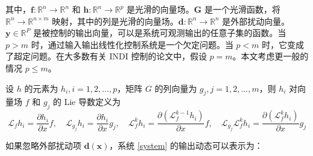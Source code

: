 \begin{ubox}
其中，$\bm{f}: \mathbb{R}^{n}\to\mathbb{R}^{n}$ 和 $\bm{h}: \mathbb{R}^{n}\to\mathbb{R}^{p}$ 是光滑的向量场。$\bm{G}$ 是一个光滑函数，将 $\mathbb{R}^{n}\to\mathbb{R}^{n\times m}$ 映射，其中的列是光滑的向量场。$\bm{d}: \mathbb{R}^{n}\to\mathbb{R}^{n}$ 是外部扰动向量。$\bm{y}\in\mathbb{R}^{P}$ 是被控制的输出向量，可以是系统可观测输出的任意子集的函数。当 $p>m$ 时，通过输入输出线性化控制系统是一个欠定问题。当 $p<m$ 时，它变成了超定问题。在大多数有关 INDI 控制的论文中，假设 $p=m$。本文考虑更一般的情况 $p\leq m$。

设 $h$ 的元素为 $h_i, i = 1, 2, ..., p$，矩阵 $G$ 的列向量为 $g_j, j = 1, 2, ..., m$，则 $h_i$ 对向量场 $f$ 和 $g_j$ 的 Lie 导数定义为
\begin{equation}
  \mathcal{L}_{f}h_{i}=\frac{\partial h_{i}}{\partial x}f,\quad\mathcal{L}_{g_{j}}h_{i}=\frac{\partial h_{i}}{\partial x}g_{j},\quad\mathcal{L}_{f}^{k}h_{i}=\frac{\partial(\mathcal{L}_{f}^{k-1}h_{i})}{\partial x}f,\quad\mathcal{L}_{g_{j}}\mathcal{L}_{f}^{k}h_{i}=\frac{\partial(\mathcal{L}_{f}^{k}h_{i})}{\partial x}g_{j}
\end{equation}

如果忽略外部扰动项 $\bm{d}(\bm{x})$，系统 \eqref{system} 的输出动态可以表示为：


\end{ubox}

